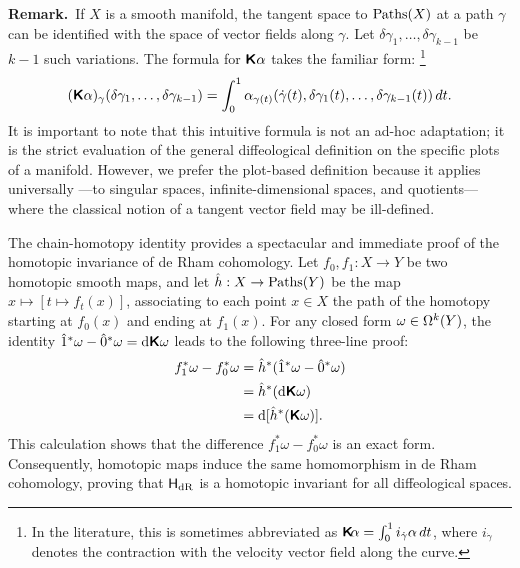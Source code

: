 \documentclass[10pt,reqno,letterpaper,twoside]{amsbook}
\begin{document}
\begin{article}
    \textbf{Remark.}~If $X$ is a smooth manifold,
    the tangent space to $\operatorname{Paths}(X)$ at a path $\gamma$ can be identified with the space of vector fields along $\gamma$.
    Let $\delta\gamma_1, \dots, \delta\gamma_{k-1}$ be $k-1$ such variations.
    The formula for $\boldsymbol{\mathsf{K}}\alpha$ takes the familiar form:%
    \footnote{In the literature, this is sometimes abbreviated as $\boldsymbol{\mathsf{K}}\!\alpha = \int_0^1 i_{\dot{\gamma}} \alpha \, dt$, where $i_{\dot{\gamma}}$ denotes the contraction with the velocity vector field along the curve.}
    \[
      (\boldsymbol{\mathsf{K}}\alpha)_\gamma(\delta\gamma_1, \dots, \delta\gamma_{k-1}) = \int_0^1 \alpha_{\gamma(t)}(\dot{\gamma}(t), \delta\gamma_1(t), \dots, \delta\gamma_{k-1}(t)) \, dt.
      \]
    It is important to note that this intuitive formula is not an ad-hoc adaptation;
    it is the strict evaluation of the general diffeological definition on the specific plots of a manifold.
    However,
    we prefer the plot-based definition because it applies universally
    ---to singular spaces,
    infinite-dimensional spaces,
    and quotients---
    where the classical notion of a tangent vector field may be ill-defined.
  \end{article}
  
  \begin{article}
    The chain-homotopy identity provides a spectacular and immediate proof of the homotopic invariance of de Rham cohomology.
    Let $f_0, f_1: X \to Y$ be two homotopic smooth maps,
    and let $\hat{h}: X \to \operatorname{Paths}(Y)$ be the map $x \mapsto [t \mapsto f_t(x)]$,
    associating to each point $x \in X$ the path of the homotopy starting at $f_0(x)$ and ending at $f_1(x)$.
    For any closed form $\omega \in \Omega^k(Y)$,
    the identity $\hat 1^*\omega - \hat 0^*\omega = \mathrm{d}\boldsymbol{\mathsf{K}}\omega$ leads to the following three-line proof:
    \begin{align*}
      f_1^*\omega - f_0^*\omega &= \hat{h}^*(\hat 1^*\omega - \hat 0^*\omega) \\
      &= \hat{h}^*(\mathrm{d}\boldsymbol{\mathsf{K}}\omega) \\
      &= \mathrm{d}[\hat{h}^*(\boldsymbol{\mathsf{K}}\omega)].
    \end{align*}
    This calculation shows that the difference $f_1^*\omega - f_0^*\omega$ is an exact form.
    Consequently,
    homotopic maps induce the same homomorphism in de Rham cohomology,
    proving that $\mathsf{H}_\mathrm{dR}$ is a homotopic invariant for all diffeological spaces.
  \end{article}
  
\end{document}
